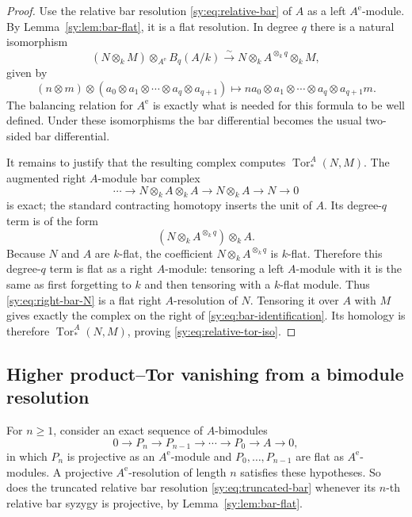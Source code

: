 \documentclass[11pt]{article}
\numberwithin{equation}{section}
\theoremstyle{definition}
\theoremstyle{remark}
\newcommand{\Tor}{\operatorname{Tor}}
\begin{document}
\begin{proof}
Use the relative bar resolution \eqref{sy:eq:relative-bar} of $A$ as a left
$A^{\mathrm e}$-module.  By Lemma~\ref{sy:lem:bar-flat}, it is a flat
resolution.  In degree $q$ there is a natural isomorphism
\begin{equation}
(N\otimes_kM)\otimes_{A^{\mathrm e}}B_q(A/k)
\xrightarrow{\sim}
N\otimes_k A^{\otimes_k q}\otimes_kM,
\label{sy:eq:bar-identification}
\end{equation}
given by
\[
(n\otimes m)\otimes
(a_0\otimes a_1\otimes\cdots\otimes a_q\otimes a_{q+1})
\longmapsto
na_0\otimes a_1\otimes\cdots\otimes a_q\otimes a_{q+1}m.
\]
The balancing relation for $A^{\mathrm e}$ is exactly what is needed for
this formula to be well defined.  Under these isomorphisms the bar
differential becomes the usual two-sided bar differential.

It remains to justify that the resulting complex computes
$\Tor_*^A(N,M)$.  The augmented right $A$-module bar complex
\begin{equation}
\cdots\longrightarrow
N\otimes_kA\otimes_kA\longrightarrow
N\otimes_kA\longrightarrow N\longrightarrow0
\label{sy:eq:right-bar-N}
\end{equation}
is exact; the standard contracting homotopy inserts the unit of $A$.
Its degree-$q$ term is of the form
\[
(N\otimes_kA^{\otimes_k q})\otimes_kA.
\]
Because $N$ and $A$ are $k$-flat, the coefficient
$N\otimes_kA^{\otimes_k q}$ is $k$-flat.  Therefore this degree-$q$ term
is flat as a right $A$-module: tensoring a left $A$-module with it is the
same as first forgetting to $k$ and then tensoring with a $k$-flat module.
Thus \eqref{sy:eq:right-bar-N} is a flat right $A$-resolution of $N$.
Tensoring it over $A$ with $M$ gives exactly the complex on the right of
\eqref{sy:eq:bar-identification}.  Its homology is therefore
$\Tor_*^A(N,M)$, proving \eqref{sy:eq:relative-tor-iso}.
\end{proof}

\subsection{Higher product--Tor vanishing from a bimodule resolution}

For $n\geq1$, consider an exact sequence of $A$-bimodules
\begin{equation}
0\longrightarrow P_n\longrightarrow P_{n-1}\longrightarrow\cdots
\longrightarrow P_0\longrightarrow A\longrightarrow0,
\label{sy:eq:abstract-resolution}
\end{equation}
in which $P_n$ is projective as an $A^{\mathrm e}$-module and
$P_0,\ldots,P_{n-1}$ are flat as $A^{\mathrm e}$-modules.
A projective $A^{\mathrm e}$-resolution of length $n$ satisfies these
hypotheses.  So does the truncated relative bar resolution
\eqref{sy:eq:truncated-bar} whenever its $n$-th relative bar
syzygy is projective, by Lemma~\ref{sy:lem:bar-flat}.
\end{document}

